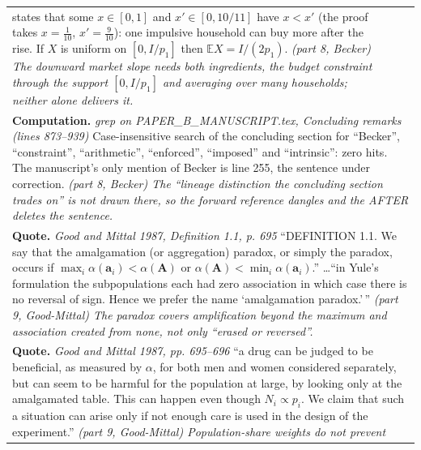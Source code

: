 \documentclass[10pt]{article}
\theoremstyle{definition}
\newlength{\fullw}\setlength{\fullw}{25.9cm}
\begin{document}
{\begin{longtable}{|p{0.9cm}|p{12.2cm}|p{12.2cm}|}
{states that some $x \in [0, 1]$ and $x' \in [0, 10/11]$ have $x < x'$ (the
proof takes $x = \tfrac{1}{10}$, $x' = \tfrac{9}{10}$): one impulsive household
can buy more after the rise. If $X$ is
uniform on $[0, I/p_1]$ then $\mathbb{E}X = I/(2p_1)$. \newline \textit{(part 8, Becker) The downward market slope needs both
ingredients, the budget constraint through the support $[0, I/p_1]$ and
averaging over many households; neither alone delivers it.}} \\
\multicolumn{3}{|p{\fullw}|}{\textbf{Computation.} \textit{grep on PAPER\_B\_MANUSCRIPT.tex, Concluding remarks (lines 873--939)} \newline Case-insensitive search of the concluding section for ``Becker'',
``constraint'', ``arithmetic'', ``enforced'', ``imposed'' and ``intrinsic'':
zero hits. The manuscript's only mention of Becker is line 255, the sentence
under correction. \newline \textit{(part 8, Becker) The ``lineage distinction the concluding section
trades on'' is not drawn there, so the forward reference dangles and the
AFTER deletes the sentence.}} \\
\multicolumn{3}{|p{\fullw}|}{\textbf{Quote.} \textit{Good and Mittal 1987, Definition 1.1, p. 695} \newline ``DEFINITION 1.1. We say that the amalgamation (or aggregation)
paradox, or simply the paradox, occurs if
$\max_i \alpha(\mathbf{a}_i) < \alpha(\mathbf{A})$ or
$\alpha(\mathbf{A}) < \min_i \alpha(\mathbf{a}_i)$.'' \ldots ``in Yule's
formulation the subpopulations each had zero association in which case there
is no reversal of sign. Hence we prefer the name `amalgamation paradox.'\,'' \newline \textit{(part 9, Good-Mittal) The paradox covers amplification beyond
the maximum and association created from none, not only ``erased or
reversed''.}} \\
\multicolumn{3}{|p{\fullw}|}{\textbf{Quote.} \textit{Good and Mittal 1987, pp. 695--696} \newline ``a drug can be judged to be beneficial, as measured by $\alpha$,
for both men and women considered separately, but can seem to be harmful for
the population at large, by looking only at the amalgamated table. This can
happen even though $N_i \propto p_i$. We claim that such a situation can
arise only if not enough care is used in the design of the experiment.'' \newline \textit{(part 9, Good-Mittal) Population-share weights do not prevent
}}
\end{longtable}}
\end{document}
